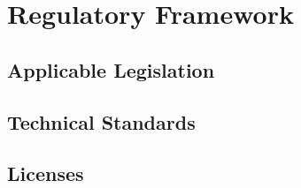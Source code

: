 \chapter{Regulatory Framework}\label{chap:regulation}

\section{Applicable Legislation}




\section{Technical Standards}




\section{Licenses}

